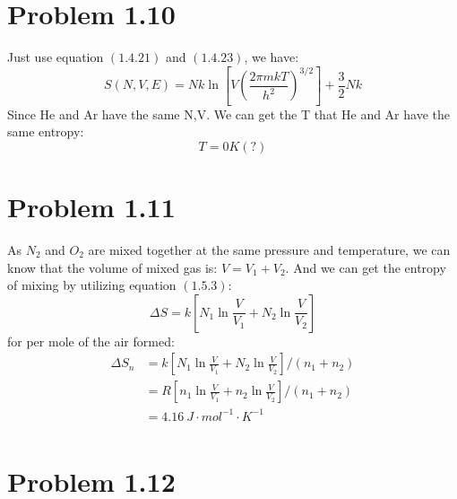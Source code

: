 \documentclass{article}
\begin{document}
\section*{Problem 1.10}
    Just use equation $(1.4.21)$ and $(1.4.23)$, we have:
    \begin{equation}
        S(N,V,E)=Nk\ln \left[V\left(\frac{2\pi m k T}{h^2}\right)^{3/2}\right]+\frac{3}{2}Nk
    \end{equation}
    Since He and Ar have the same N,V. We can get the T that He and Ar have the same entropy:
    $$
        T=0K (?)
    $$
\section*{Problem 1.11}
    As $N_2$ and $O_2$ are mixed together at the same pressure and temperature, we can know that the volume of mixed gas is: $V=V_1+V_2$. And we can get the entropy of mixing by utilizing equation $(1.5.3)$:
    \begin{equation}
        \Delta S=k \left[N_1 \ln\frac{V}{V_1}+N_2 \ln\frac{V}{V_2}\right]
    \end{equation}
    for per mole of the air formed:
    \begin{equation}
        \begin{aligned}
            \Delta S_n&=k \left[N_1 \ln\frac{V}{V_1}+N_2 \ln\frac{V}{V_2}\right]/(n_1+n_2)\\
                    &=R \left[n_1 \ln\frac{V}{V_1}+n_2 \ln\frac{V}{V_2}\right]/(n_1+n_2)\\
                    &=4.16~J\cdot mol^{-1}\cdot K^{-1}\\
        \end{aligned}
    \end{equation}
\section*{Problem 1.12}
\end{document}
